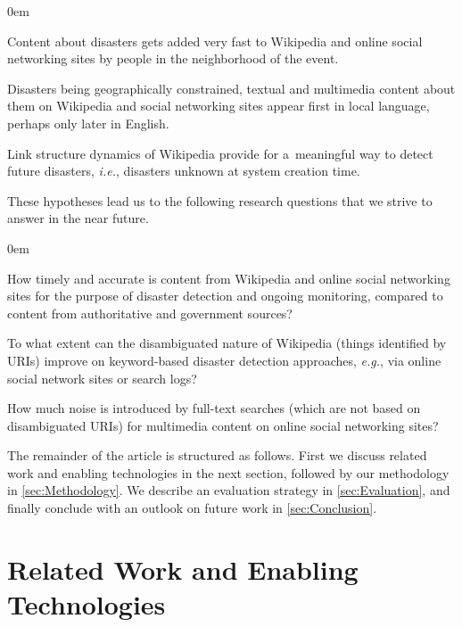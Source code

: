 \documentclass[letterpaper]{article}
\begin{document}
\begin{description}
  \itemsep0em
  \item[$\mathbb{H}1$] Content about disasters
    gets added very fast to Wikipedia and online social networking sites
    by people in the neighborhood of the event.
  \item[$\mathbb{H}2$] Disasters being geographically
    constrained, textual and multimedia content about them
    on Wikipedia and social networking sites
    appear first in local language,
    perhaps only later in English.
  \item[$\mathbb{H}3$] Link structure dynamics of Wikipedia
    provide for a~meaningful way to detect future
    disasters, \emph{i.e.}, disasters unknown at system creation time.
\end{description}

\noindent These hypotheses lead us to the following research questions
that we strive to answer in the near future.

\begin{description}
  \itemsep0em
  \item[$\mathbb{Q}1$] How timely and accurate is content from Wikipedia
    and online social networking sites
    for the purpose of disaster detection and ongoing monitoring,
    compared to content from authoritative and government sources?
  \item[$\mathbb{Q}2$] To what extent can the disambiguated nature of Wikipedia
    (things identified by URIs) improve on keyword-based disaster detection approaches,
    \emph{e.g.}, via online social network sites or search logs?
  \item[$\mathbb{Q}3$] How much noise is introduced by full-text searches
    (which are not based on disambiguated URIs)
    for multimedia content on online social networking sites?
\end{description}


The remainder of the article is structured as follows.
First we discuss related work and enabling technologies in the next section,
followed by our methodology in \cref{sec:Methodology}.
We describe an evaluation strategy in \cref{sec:Evaluation},
and finally conclude with an outlook on future work in \cref{sec:Conclusion}.

\section{Related Work and Enabling Technologies}
\label{sec:RelatedWork}
\end{document}
